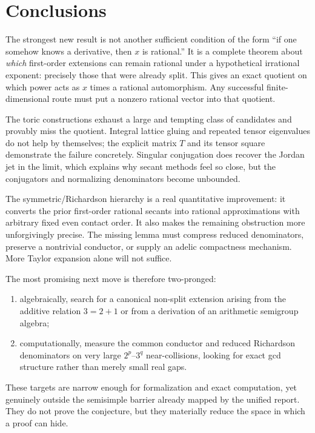 \documentclass[11pt,oneside]{article}
\theoremstyle{definition}
\theoremstyle{remark}
\begin{document}
\section{Conclusions}
\label{sec:conclusion}

The strongest new result is not another sufficient condition of the form ``if one somehow
knows a derivative, then $x$ is rational.''  It is a complete theorem about \emph{which}
first-order extensions can remain rational under a hypothetical irrational exponent:
precisely those that were already split.  This gives an exact quotient on which power acts as
$x$ times a rational automorphism.  Any successful finite-dimensional route must put a nonzero
rational vector into that quotient.

The toric constructions exhaust a large and tempting class of candidates and provably miss the
quotient.  Integral lattice gluing and repeated tensor eigenvalues do not help by themselves;
the explicit matrix $T$ and its tensor square demonstrate the failure concretely.  Singular
conjugation does recover the Jordan jet in the limit, which explains why secant methods feel so
close, but the conjugators and normalizing denominators become unbounded.

The symmetric/Richardson hierarchy is a real quantitative improvement: it converts the prior
first-order rational secants into rational approximations with arbitrary fixed even contact
order.  It also makes the remaining obstruction more unforgivingly precise.  The missing lemma
must compress reduced denominators, preserve a nontrivial conductor, or supply an adelic
compactness mechanism.  More Taylor expansion alone will not suffice.

The most promising next move is therefore two-pronged:
\begin{enumerate}
\item algebraically, search for a canonical non-split extension arising from the additive
relation $3=2+1$ or from a derivation of an arithmetic semigroup algebra;
\item computationally, measure the common conductor and reduced Richardson denominators on very
large $2^p$--$3^q$ near-collisions, looking for exact gcd structure rather than merely small
real gaps.
\end{enumerate}

These targets are narrow enough for formalization and exact computation, yet genuinely outside
the semisimple barrier already mapped by the unified report.  They do not prove the conjecture,
but they materially reduce the space in which a proof can hide.
\end{document}
